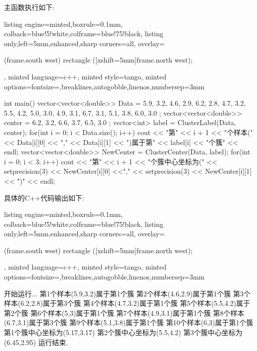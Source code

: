 \documentclass{article}
\begin{document}
\begin{homeworkProblem}
主函数执行如下:
\begin{tcblisting}{listing engine=minted,boxrule=0.1mm,
colback=blue!5!white,colframe=blue!75!black,
listing only,left=5mm,enhanced,sharp corners=all,
overlay={\begin{tcbclipinterior} (frame.south west)
rectangle ([xshift=5mm]frame.north west);\end{tcbclipinterior}},
minted language=c++,
minted style=tango,
minted options={fontsize=\small,breaklines,autogobble,linenos,numbersep=3mm}}
int main() {
    vector<vector<double>> Data = {
        {5.9, 3.2}, {4.6, 2.9}, {6.2, 2.8}, {4.7, 3.2}, {5.5, 4.2},
        {5.0, 3.0}, {4.9, 3.1}, {6.7, 3.1}, {5.1, 3.8}, {6.0, 3.0}
    };
    vector<vector<double>> center = {
        {6.2, 3.2}, {6.6, 3.7}, {6.5, 3.0}
    };
    vector<int> label = ClusterLabel(Data, center);
    for(int i = 0; i < Data.size(); i++) {
        cout << "第" << i + 1 << "个样本(" << Data[i][0] << "," 
        << Data[i][1] << ")属于第" << label[i] << "个簇" << endl; 
    }
    vector<vector<double>> NewCenter = ClusterCenter(Data, label);
    for(int i = 0; i < 3; i++) {
        cout << "第" << i + 1 << "个簇中心坐标为("
        << setprecision(3) << NewCenter[i][0] <<"," << 
        setprecision(3) << NewCenter[i][1] << ")" << endl;
    }
}
\end{tcblisting}


	具体的C++代码输出如下:
\begin{tcblisting}{listing engine=minted,boxrule=0.1mm,
colback=blue!5!white,colframe=blue!75!black,
listing only,left=5mm,enhanced,sharp corners=all,
overlay={\begin{tcbclipinterior} (frame.south west)
rectangle ([xshift=5mm]frame.north west);\end{tcbclipinterior}},
minted language=c++,
minted style=tango,
minted options={fontsize=\small,breaklines,autogobble,linenos,numbersep=3mm}}
开始运行...
第1个样本(5.9,3.2)属于第1个簇
第2个样本(4.6,2.9)属于第1个簇
第3个样本(6.2,2.8)属于第3个簇
第4个样本(4.7,3.2)属于第1个簇
第5个样本(5.5,4.2)属于第2个簇
第6个样本(5,3)属于第1个簇
第7个样本(4.9,3.1)属于第1个簇
第8个样本(6.7,3.1)属于第3个簇
第9个样本(5.1,3.8)属于第1个簇
第10个样本(6,3)属于第1个簇
第1个簇中心坐标为(5.17,3.17)
第2个簇中心坐标为(5.5,4.2)
第3个簇中心坐标为(6.45,2.95)
运行结束.
\end{tcblisting}
\end{homeworkProblem}
\end{document}
